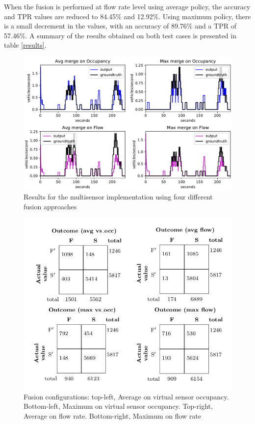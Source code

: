 When the fusion is performed at flow rate level using average policy, the accuracy and TPR values are reduced to 84.45\% and 12.92\%. Using maximum policy, there is a small decrement in the values, with an accuracy of 89.76\% and a TPR of 57.46\%. A summary of the results obtained on both test cases is presented in table \ref{results}.


\begin{figure}[htb!]
\centering
\includegraphics[scale=0.5]{fig/4/vl_res.pdf}
\caption{Results for the multisensor implementation using four different fusion approaches}
\label{vl_res}
\end{figure}

\begin{figure}[htb!]
\centering
\includegraphics[scale=0.4]{fig/4/conf_mat.jpeg}
\caption{Fusion configurations: top-left, Average on virtual sensor occupancy. Bottom-left, Maximum on virtual sensor occupancy. Top-right, Average on flow rate. Bottom-right, Maximum on flow rate}
\label{vl_cf}
\end{figure}


